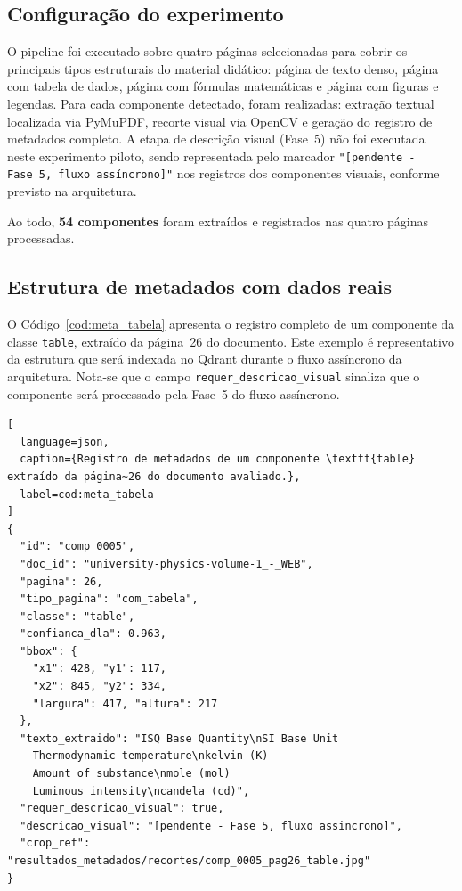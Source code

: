 \subsection{Configuração do experimento}
\label{subsec:meta_config}

O pipeline foi executado sobre quatro páginas selecionadas para cobrir
os principais tipos estruturais do material didático: página de texto
denso, página com tabela de dados, página com fórmulas matemáticas e
página com figuras e legendas. Para cada componente detectado, foram
realizadas: extração textual localizada via PyMuPDF, recorte visual
via OpenCV e geração do registro de metadados completo. A etapa de
descrição visual (Fase~5) não foi executada neste experimento piloto,
sendo representada pelo marcador
\texttt{"[pendente - Fase~5, fluxo assíncrono]"} nos registros dos
componentes visuais, conforme previsto na arquitetura.

Ao todo, \textbf{54 componentes} foram extraídos e registrados nas
quatro páginas processadas.

\subsection{Estrutura de metadados com dados reais}
\label{subsec:meta_estrutura}

O Código~\ref{cod:meta_tabela} apresenta o registro completo de um
componente da classe \texttt{table}, extraído da página~26 do documento.
Este exemplo é representativo da estrutura que será indexada no Qdrant
durante o fluxo assíncrono da arquitetura. Nota-se que o campo \texttt{requer\_descricao\_visual} sinaliza que o componente será processado pela Fase~5 do fluxo assíncrono.

\begin{lstlisting}[
  language=json,
  caption={Registro de metadados de um componente \texttt{table} extraído da página~26 do documento avaliado.},
  label=cod:meta_tabela
]
{
  "id": "comp_0005",
  "doc_id": "university-physics-volume-1_-_WEB",
  "pagina": 26,
  "tipo_pagina": "com_tabela",
  "classe": "table",
  "confianca_dla": 0.963,
  "bbox": {
    "x1": 428, "y1": 117,
    "x2": 845, "y2": 334,
    "largura": 417, "altura": 217
  },
  "texto_extraido": "ISQ Base Quantity\nSI Base Unit
    Thermodynamic temperature\nkelvin (K)
    Amount of substance\nmole (mol)
    Luminous intensity\ncandela (cd)",
  "requer_descricao_visual": true,
  "descricao_visual": "[pendente - Fase 5, fluxo assincrono]",
  "crop_ref": "resultados_metadados/recortes/comp_0005_pag26_table.jpg"
}
\end{lstlisting}

